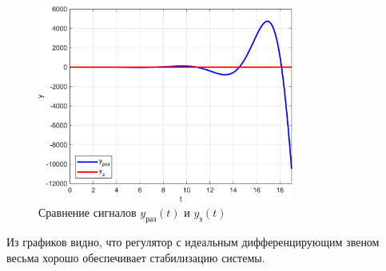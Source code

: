 \begin{figure}[H]
    \centering
    \includegraphics[width=0.75\textwidth, trim={0cm 0cm 0cm 0cm}]{../images/1_3.png}
    \caption{Сравнение сигналов $y_{\text{раз}}(t)$ и $y_{\text{з}}(t)$}
\end{figure}

Из графиков видно, что регулятор с идеальным дифференцирующим звеном
весьма хорошо обеспечивает стабилизацию системы.
\endinput